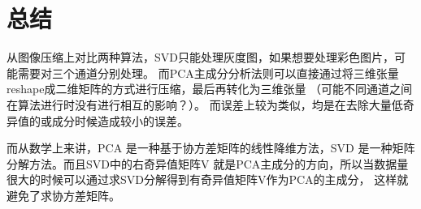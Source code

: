 \documentclass[UTF8]{ctexart}
\begin{document}
\section{总结}
从图像压缩上对比两种算法，SVD只能处理灰度图，如果想要处理彩色图片，可能需要对三个通道分别处理。
而PCA主成分分析法则可以直接通过将三维张量reshape成二维矩阵的方式进行压缩，最后再转化为三维张量
（可能不同通道之间在算法进行时没有进行相互的影响？）。
而误差上较为类似，均是在去除大量低奇异值的或成分时候造成较小的误差。

而从数学上来讲，PCA 是一种基于协方差矩阵的线性降维方法，SVD 是一种矩阵分解方法。而且SVD中的右奇异值矩阵V
就是PCA主成分的方向，所以当数据量很大的时候可以通过求SVD分解得到有奇异值矩阵V作为PCA的主成分，
这样就避免了求协方差矩阵。
\end{document}
